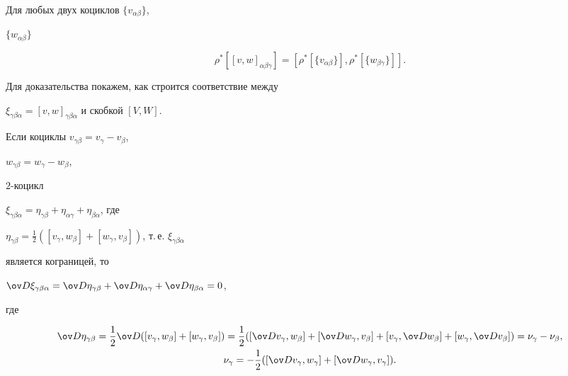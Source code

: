 \begin{assrt}


Для любых двух коциклов $\{v_{\alpha \beta}\}$,


$\{w_{\alpha \beta} \}$


$$


\rho^{\ast} [[v, w]_{\alpha \beta \gamma}] =


[\rho^{\ast}[\{v_{\alpha \beta}\}], \rho^{\ast}[\{


w_{\beta \gamma}\}]].


$$


\end{assrt}





Для доказательства покажем, как строится соответствие между


$\xi_{\gamma \beta \alpha}=[v, w]_{\gamma \beta


\alpha} $ и скобкой $[V, W]$.


Если коциклы $v_{\gamma \beta}=v_{\gamma} - v_{\beta}$,


$w_{\gamma \beta}=w_{\gamma} - w_{\beta}$,


$2$-коцикл


$\xi_{\gamma \beta \alpha}=\eta_{\gamma \beta} +


\eta_{\alpha \gamma} + \eta_{\beta \alpha} $, где


$\eta_{\gamma \beta}=\frac{1}{2} ([v_{\gamma}, w_{\beta}] +


[w_{\gamma}, v_{\beta}])$, т.\,е. $\xi_{\gamma \beta\alpha}$


является кограницей, то


$\ov D \xi_{\gamma \beta \alpha} =\ov D \eta_{\gamma \beta}


+ \ov D \eta_{\alpha \gamma} + \ov D \eta_{\beta \alpha}=0$,


где


\begin{gather*}


\ov D \eta_{\gamma \beta} =


 \frac{1}{2} \ov D ([v_{\gamma}, w_{\beta}] +


[w_{\gamma}, v_{\beta}])


= \frac{1}{2}([\ov D v_{\gamma}, w_{\beta}] +


[\ov D w_{\gamma}, v_{\beta}]+


[v_{\gamma}, \ov D w_{\beta}] +


[w_{\gamma}, \ov D v_{\beta}])=\nu_{\gamma} - \nu_{\beta},\\


%


\nu_{\gamma} =


- \frac{1}{2} ([\ov D v_{\gamma}, w_{\gamma}] +


[\ov D w_{\gamma}, v_{\gamma}]).


\end{gather*}


